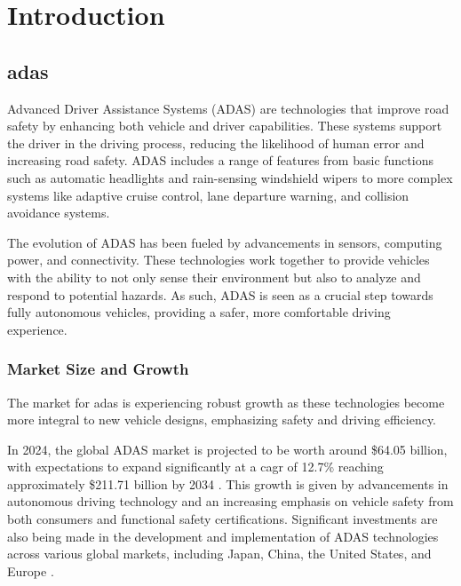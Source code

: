 \chapter{Introduction}

\section{\acl{adas}}
Advanced Driver Assistance Systems (ADAS) are technologies that improve road 
safety by enhancing both vehicle and driver capabilities. These systems support 
the driver in the driving process, reducing the likelihood of human error and 
increasing road safety. ADAS includes a range of features from basic functions 
such as automatic headlights and rain-sensing windshield wipers to more complex 
systems like adaptive cruise control, lane departure warning, and collision 
avoidance systems.

The evolution of ADAS has been fueled by advancements in sensors, computing 
power, and connectivity. These technologies work together to provide vehicles 
with the ability to not only sense their environment but also to analyze and 
respond to potential hazards. As such, ADAS is seen as a crucial step towards 
fully autonomous vehicles, providing a safer, more comfortable driving experience.

\subsection{Market Size and Growth}
The market for \ac{adas} is experiencing robust growth as these technologies 
become more integral to new vehicle designs, emphasizing safety and driving 
efficiency. 

In 2024, the global ADAS market is projected to be worth around 
\$64.05 billion, with expectations to expand significantly at a \ac{cagr} 
of 12.7\% reaching approximately \$211.71 billion by 2034 \cite{adas_report_2023}.
This growth is given by advancements in autonomous driving technology and 
an increasing emphasis on vehicle safety from both consumers and functional 
safety certifications. 
Significant investments are also being made in the development and 
implementation of ADAS technologies across various global markets, including 
Japan, China, the United States, and Europe \cite{adas_report_2023}.

